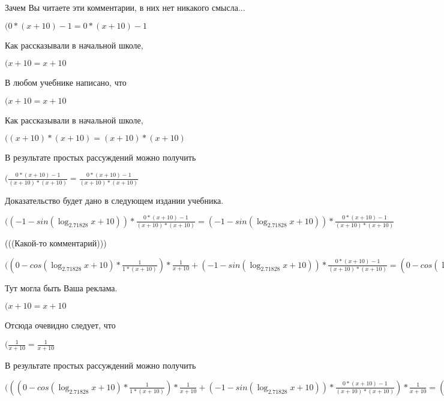 \documentclass[12pt,a4paper,fleqn]{article}
\theoremstyle{definition}
\begin{document}
Зачем Вы читаете эти комментарии, в них нет никакого смысла...

$( 0  * ( x  +  10 ) -  1  =  0  * ( x  +  10 ) -  1 $

Как рассказывали в начальной школе,

$( x  +  10  =  x  +  10 $

В любом учебнике написано, что

$( x  +  10  =  x  +  10 $

Как рассказывали в начальной школе,

$(( x  +  10 ) * ( x  +  10 ) = ( x  +  10 ) * ( x  +  10 )$

В результате простых рассуждений можно получить

$(\frac{ 0  * ( x  +  10 ) -  1 }{( x  +  10 ) * ( x  +  10 )}
 = \frac{ 0  * ( x  +  10 ) -  1 }{( x  +  10 ) * ( x  +  10 )}
$

Доказательство будет дано в следующем издании учебника.

$(( -1  - sin(\log_{ 2.71828 }{ x  +  10 })) * \frac{ 0  * ( x  +  10 ) -  1 }{( x  +  10 ) * ( x  +  10 )}
 = ( -1  - sin(\log_{ 2.71828 }{ x  +  10 })) * \frac{ 0  * ( x  +  10 ) -  1 }{( x  +  10 ) * ( x  +  10 )}
$

(((Какой-то комментарий)))

$(( 0  - cos(\log_{ 2.71828 }{ x  +  10 }) * \frac{ 1 }{ 1  * ( x  +  10 )}
) * \frac{ 1 }{ x  +  10 }
 + ( -1  - sin(\log_{ 2.71828 }{ x  +  10 })) * \frac{ 0  * ( x  +  10 ) -  1 }{( x  +  10 ) * ( x  +  10 )}
 = ( 0  - cos(\log_{ 2.71828 }{ x  +  10 }) * \frac{ 1 }{ 1  * ( x  +  10 )}
) * \frac{ 1 }{ x  +  10 }
 + ( -1  - sin(\log_{ 2.71828 }{ x  +  10 })) * \frac{ 0  * ( x  +  10 ) -  1 }{( x  +  10 ) * ( x  +  10 )}
$

Тут могла быть Ваша реклама.

$( x  +  10  =  x  +  10 $

Отсюда очевидно следует, что

$(\frac{ 1 }{ x  +  10 }
 = \frac{ 1 }{ x  +  10 }
$

В результате простых рассуждений можно получить

$((( 0  - cos(\log_{ 2.71828 }{ x  +  10 }) * \frac{ 1 }{ 1  * ( x  +  10 )}
) * \frac{ 1 }{ x  +  10 }
 + ( -1  - sin(\log_{ 2.71828 }{ x  +  10 })) * \frac{ 0  * ( x  +  10 ) -  1 }{( x  +  10 ) * ( x  +  10 )}
) * \frac{ 1 }{ x  +  10 }
 = (( 0  - cos(\log_{ 2.71828 }{ x  +  10 }) * \frac{ 1 }{ 1  * ( x  +  10 )}
) * \frac{ 1 }{ x  +  10 }
 + ( -1  - sin(\log_{ 2.71828 }{ x  +  10 })) * \frac{ 0  * ( x  +  10 ) -  1 }{( x  +  10 ) * ( x  +  10 )}
) * \frac{ 1 }{ x  +  10 }
$
\end{document}

